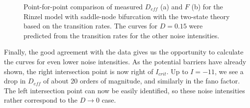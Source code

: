 \documentclass[12pt,a4paper]{article}
\begin{document}
\begin{figure}[H]
	\hspace*{-0.5cm}
	\caption{Point-for-point comparison of measured $D_{eff}$ (a) and $F$ (b) for the Rinzel model with saddle-node bifurcation with the two-state theory based on the transition rates. The curves for $D=0.15$ were predicted from the transition rates for the other noise intensities.}
\end{figure}
Finally, the good agreement with the data gives us the opportunity to calculate the curves for even lower noise intensities. As the potential barriers have already shown, the right intersection point is now right of $I_{crit}$. Up to $I=-11$, we see a drop in $D_{eff}$ of about 20 orders of magnitude, and similarly in the fano factor. The left intersection point can now be easily identified, so these noise intensities rather correspond to the $D\rightarrow0$ case.
\end{document}
